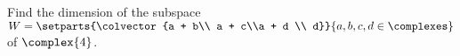 Find the dimension of the subspace $W = \setparts{\colvector{a + b\\ a + c\\a + d \\ d}}{a, b, c, d \in\complexes}$ of $\complex{4}$.